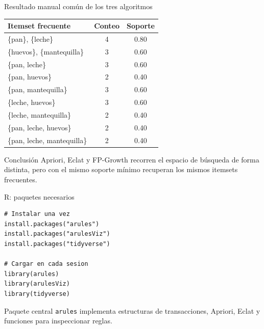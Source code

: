 \documentclass[10pt,aspectratio=169]{beamer}
\begin{document}
\begin{frame}{Resultado manual común de los tres algoritmos}
\scriptsize
\begin{table}
\centering
\begin{tabular}{lcc}
\toprule
Itemset frecuente & Conteo & Soporte \\
\midrule
\{pan\}, \{leche\} & 4 & 0.80 \\
\{huevos\}, \{mantequilla\} & 3 & 0.60 \\
\{pan, leche\} & 3 & 0.60 \\
\{pan, huevos\} & 2 & 0.40 \\
\{pan, mantequilla\} & 3 & 0.60 \\
\{leche, huevos\} & 3 & 0.60 \\
\{leche, mantequilla\} & 2 & 0.40 \\
\{pan, leche, huevos\} & 2 & 0.40 \\
\{pan, leche, mantequilla\} & 2 & 0.40 \\
\bottomrule
\end{tabular}
\end{table}

\begin{block}{Conclusión}
Apriori, Eclat y FP-Growth recorren el espacio de búsqueda de forma distinta, pero con el mismo soporte mínimo recuperan los mismos itemsets frecuentes.
\end{block}
\end{frame}



\begin{frame}[fragile]{R: paquetes necesarios}
\begin{lstlisting}[style=Rstyle]
# Instalar una vez
install.packages("arules")
install.packages("arulesViz")
install.packages("tidyverse")

# Cargar en cada sesion
library(arules)
library(arulesViz)
library(tidyverse)
\end{lstlisting}

\begin{block}{Paquete central}
\texttt{arules} implementa estructuras de transacciones, Apriori, Eclat y funciones para inspeccionar reglas.
\end{block}
\end{frame}
\end{document}
